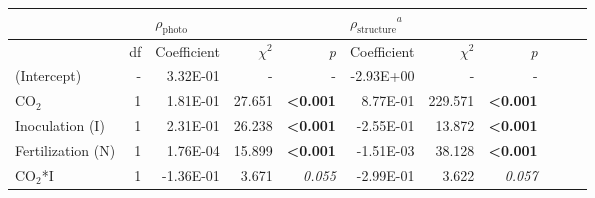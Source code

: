 \begin{landscape}
\begin{table}
{\begin{tabular}{p{3cm}p{0.5cm}p{1.75cm}p{1.5cm}p{1.5cm}p{1.75cm}p{1.5cm}p{1.5cm}p{1.75cm}p{1.5cm}p{1.5cm}}
            &&  \multicolumn{3}{l}{$\rho_\mathrm{photo}$} 
            &   \multicolumn{3}{l}{$\rho_\mathrm{structure}{}^a$} 
            &&& \\
            \hline
            & \multicolumn{1}{r}{df}
            & \multicolumn{1}{r}{Coefficient}   & \multicolumn{1}{r}{$\chi^{2}$}    & \multicolumn{1}{r}{\textit{p}} 
            & \multicolumn{1}{r}{Coefficient}   & \multicolumn{1}{r}{$\chi^{2}$}    & \multicolumn{1}{r}{\textit{p}} 
            \\
            \hline

            (Intercept) & \multicolumn{1}{r}{-}
            & \multicolumn{1}{r}{3.32E-01}      & \multicolumn{1}{r}{-}             & \multicolumn{1}{r}{-}
            & \multicolumn{1}{r}{-2.93E+00}     & \multicolumn{1}{r}{-}             & \multicolumn{1}{r}{-}
            & \multicolumn{1}{r}{}              & \multicolumn{1}{r}{}              & \multicolumn{1}{r}{}
            \\

            CO$_2$ & \multicolumn{1}{r}{1}
            & \multicolumn{1}{r}{1.81E-01}      & \multicolumn{1}{r}{27.651}        & \multicolumn{1}{r}{\textbf{<0.001}}
            & \multicolumn{1}{r}{8.77E-01}      & \multicolumn{1}{r}{229.571}       & \multicolumn{1}{r}{\textbf{<0.001}}
            & \multicolumn{1}{r}{}              & \multicolumn{1}{r}{}              & \multicolumn{1}{r}{} 
            \\

            Inoculation (I) & \multicolumn{1}{r}{1}
            & \multicolumn{1}{r}{2.31E-01}      & \multicolumn{1}{r}{26.238}        & \multicolumn{1}{r}{\textbf{<0.001}}
            & \multicolumn{1}{r}{-2.55E-01}     & \multicolumn{1}{r}{13.872}        & \multicolumn{1}{r}{\textbf{<0.001}}
            & \multicolumn{1}{r}{}              & \multicolumn{1}{r}{}              & \multicolumn{1}{r}{} 
            \\

            Fertilization (N) & \multicolumn{1}{r}{1}
            & \multicolumn{1}{r}{1.76E-04}      & \multicolumn{1}{r}{15.899}        & \multicolumn{1}{r}{\textbf{<0.001}}
            & \multicolumn{1}{r}{-1.51E-03}     & \multicolumn{1}{r}{38.128}        & \multicolumn{1}{r}{\textbf{<0.001}}
            & \multicolumn{1}{r}{}              & \multicolumn{1}{r}{}              & \multicolumn{1}{r}{} 
            \\

            CO$_2$*I & \multicolumn{1}{r}{1}
            & \multicolumn{1}{r}{-1.36E-01}     & \multicolumn{1}{r}{3.671}         & \multicolumn{1}{r}{\textit{0.055}}
            & \multicolumn{1}{r}{-2.99E-01}     & \multicolumn{1}{r}{3.622}         & \multicolumn{1}{r}{\textit{0.057}}
            & \multicolumn{1}{r}{}              & \multicolumn{1}{r}{}              & \multicolumn{1}{r}{} 
            \\


\end{tabular}}
\end{table}
\end{landscape}
